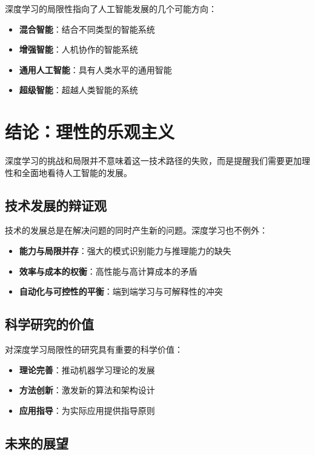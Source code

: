 深度学习的局限性指向了人工智能发展的几个可能方向：

\begin{itemize}
\item \textbf{混合智能}：结合不同类型的智能系统
\item \textbf{增强智能}：人机协作的智能系统
\item \textbf{通用人工智能}：具有人类水平的通用智能
\item \textbf{超级智能}：超越人类智能的系统
\end{itemize}

\section{结论：理性的乐观主义}

深度学习的挑战和局限并不意味着这一技术路径的失败，而是提醒我们需要更加理性和全面地看待人工智能的发展。

\subsection{技术发展的辩证观}

技术的发展总是在解决问题的同时产生新的问题。深度学习也不例外：

\begin{itemize}
\item \textbf{能力与局限并存}：强大的模式识别能力与推理能力的缺失
\item \textbf{效率与成本的权衡}：高性能与高计算成本的矛盾
\item \textbf{自动化与可控性的平衡}：端到端学习与可解释性的冲突
\end{itemize}

\subsection{科学研究的价值}

对深度学习局限性的研究具有重要的科学价值：

\begin{itemize}
\item \textbf{理论完善}：推动机器学习理论的发展
\item \textbf{方法创新}：激发新的算法和架构设计
\item \textbf{应用指导}：为实际应用提供指导原则
\end{itemize}

\subsection{未来的展望}

